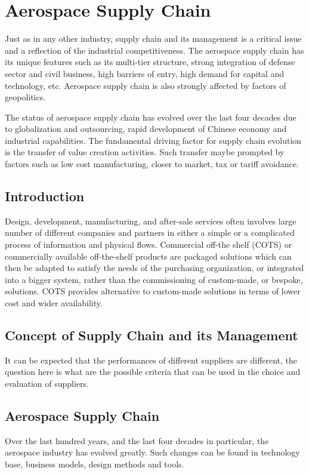 \chapter{Aerospace Supply Chain}\label{ch-supply}

Just as in any other industry, supply chain and its management is a critical issue and a reflection of the industrial competitiveness. The aerospace supply chain has its unique features such as its multi-tier structure, strong integration of defense sector and civil business, high barriers of entry, high demand for capital and technology, etc. Aerospace supply chain is also strongly affected by factors of geopolitics.

The status of aerospace supply chain has evolved over the last four decades due to globalization and outsourcing, rapid development of Chinese economy and industrial capabilities. The fundamental driving factor for supply chain evolution is the transfer of value creation activities. Such transfer maybe prompted by factors such as low cost manufacturing, closer to market, tax or tariff avoidance. 

\section{Introduction}
Design, development, manufacturing, and after-sale services often involves large number of different companies and partners in either a simple or a complicated process of information and physical flows.  Commercial off-the shelf (COTS) or commercially available off-the-shelf products are packaged solutions which can then be adapted to satisfy the needs of the purchasing organization, or integrated into a bigger system, rather than the commissioning of custom-made, or bespoke, solutions. COTS provides alternative to custom-made solutions in terms of lower cost and wider availability. 


\section{Concept of Supply Chain and its Management}




It can be expected that the performances of different suppliers are different, the question here is what are the possible criteria that can be used in the choice and evaluation of suppliers. 



\section{Aerospace Supply Chain}
Over the last hundred years, and the last four decades in particular, the aerospace industry has evolved greatly. Such changes can be found in technology base, business models, design methods and tools. 
